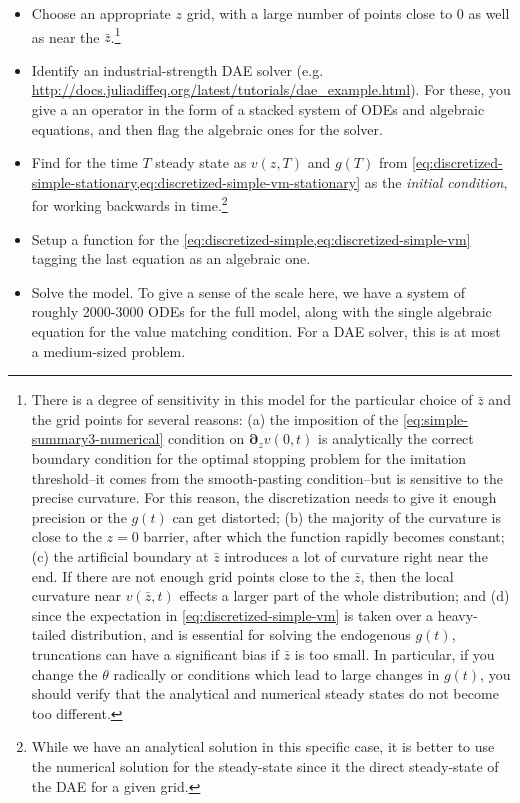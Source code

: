 \documentclass[11pt]{article}
\newcommand{\D}[1][]{\ensuremath{\boldsymbol{\partial}_{#1}}}
\begin{document}
\begin{itemize}
	\item Choose an appropriate $z$ grid, with a large number of points close to $0$ as well as near the $\bar{z}$.\footnote{There is a degree of sensitivity in this model for the particular choice of $\bar{z}$ and the grid points for several reasons: (a) the imposition of the \cref{eq:simple-summary3-numerical} condition on $\D[z]v(0,t)$  is analytically the correct boundary condition for the optimal stopping problem for the imitation threshold--it comes from the smooth-pasting condition--but is sensitive to the precise curvature.  For this reason, the discretization needs to give it enough precision or the $g(t)$ can get distorted; (b) the majority of the curvature is close to the $z=0$ barrier, after which the function rapidly becomes constant; (c) the artificial boundary at $\bar{z}$ introduces a lot of curvature right near the end.  If there are not enough grid points close to the $\bar{z}$, then the local curvature near $v(\bar{z},t)$ effects a larger part of the whole distribution; and (d) since the expectation in \cref{eq:discretized-simple-vm} is taken over a heavy-tailed distribution, and is essential for solving the endogenous $g(t)$, truncations can have a significant bias if $\bar{z}$ is too small.  In particular, if you change the $\theta$ radically or conditions which lead to large changes in $g(t)$, you should verify that the analytical and numerical steady states do not become too different.}
	\item Identify an industrial-strength DAE solver (e.g. \url{http://docs.juliadiffeq.org/latest/tutorials/dae_example.html}).  For these, you give a an operator in the form of a stacked system of ODEs and algebraic equations, and then flag the algebraic ones for the solver.
	\item Find for the time $T$ steady state as $v(z,T)$ and $g(T)$ from \cref{eq:discretized-simple-stationary,eq:discretized-simple-vm-stationary} as the \textit{initial condition}, for working backwards in time.\footnote{While we have an analytical solution in this specific case, it is better to use the numerical solution for the steady-state since it the direct steady-state of the DAE for a given grid.}
	\item Setup a function for the \cref{eq:discretized-simple,eq:discretized-simple-vm} tagging the last equation as an algebraic one.
	\item Solve the model.  To give a sense of the scale here, we have a system of roughly 2000-3000 ODEs for the full model, along with the single algebraic equation for the value matching condition.  For a DAE solver, this is at most a medium-sized problem.
\end{itemize}
\end{document}
